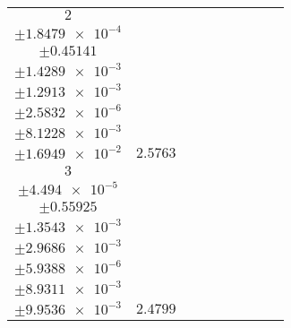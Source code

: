 \documentclass[8pt]{article}
\begin{document}
\begin{longtable}[l]{c c c c c c c c c}
$\num{2}$ & \begin{tabular}[c]{@{}c@{}}$\num{3.0172e-2}$ \\ $\pm\num{1.8479e-4}$\end{tabular} & \begin{tabular}[c]{@{}c@{}}$\num{-0.26856}$ \\ $\pm\num{0.45141}$\end{tabular} & \begin{tabular}[c]{@{}c@{}}$\num{-7.2843}$ \\ $\pm\num{1.4289e-3}$\end{tabular} & \begin{tabular}[c]{@{}c@{}}$\num{1.1725e+3}$ \\ $\pm\num{1.2913e-3}$\end{tabular} & \begin{tabular}[c]{@{}c@{}}$\num{2.3457}$ \\ $\pm\num{2.5832e-6}$\end{tabular} & \begin{tabular}[c]{@{}c@{}}$\num{1.1496}$ \\ $\pm\num{8.1228e-3}$\end{tabular} & \begin{tabular}[c]{@{}c@{}}$\num{4.0873}$ \\ $\pm\num{1.6949e-2}$\end{tabular} & $\num{2.5763}$\\
$\num{3}$ & \begin{tabular}[c]{@{}c@{}}$\num{2.9612e-2}$ \\ $\pm\num{4.494e-5}$\end{tabular} & \begin{tabular}[c]{@{}c@{}}$\num{-0.34709}$ \\ $\pm\num{0.55925}$\end{tabular} & \begin{tabular}[c]{@{}c@{}}$\num{-7.0649}$ \\ $\pm\num{1.3543e-3}$\end{tabular} & \begin{tabular}[c]{@{}c@{}}$\num{1.1728e+3}$ \\ $\pm\num{2.9686e-3}$\end{tabular} & \begin{tabular}[c]{@{}c@{}}$\num{2.3463}$ \\ $\pm\num{5.9388e-6}$\end{tabular} & \begin{tabular}[c]{@{}c@{}}$\num{1.1425}$ \\ $\pm\num{8.9311e-3}$\end{tabular} & \begin{tabular}[c]{@{}c@{}}$\num{4.0861}$ \\ $\pm\num{9.9536e-3}$\end{tabular} & $\num{2.4799}$\\

\end{longtable}
\end{document}
